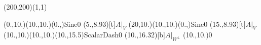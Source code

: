 \unitlength=1bp%

\begin{feynartspicture}(200,200)(1,1)

\FADiagram{}
\FAProp(0.,10.)(10.,10.)(0.,){Sine}{0}
\FALabel(5.,8.93)[t]{$A|_V$}
\FAProp(20,10.)(10.,10.)(0.,){Sine}{0}
\FALabel(15.,8.93)[t]{$A|_V$}
\FAProp(10.,10.)(10.,10.)(10.,15.5){ScalarDash}{0}
\FALabel(10.,16.32)[b]{$A|_{W^\perp}$}
\FAVert(10.,10.){0}
\end{feynartspicture}

